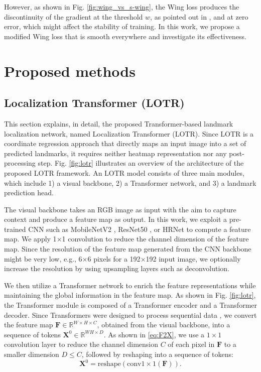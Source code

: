 \documentclass[journal]{IEEEtran}
\begin{document}
However, as shown in Fig. \ref{fig:wing_vs_s-wing}, the Wing loss produces the discontinuity of the gradient at the threshold $w$, as pointed out in \cite{Wang2019c}, and at zero error, which might affect the stability of training. 
In this work, we propose a modified Wing loss that is smooth everywhere and investigate its effectiveness.



\section{Proposed methods}\label{sec:proposed}

\subsection{Localization Transformer (LOTR)}\label{subsec:lotr}

This section explains, in detail, the proposed Transformer-based landmark localization network, named Localization Transformer (LOTR). 
Since LOTR is a coordinate regression approach that directly maps an input image into a set of predicted landmarks, it requires neither heatmap representation nor any post-processing step.  
Fig. \ref{fig:lotr} illustrates an overview of the architecture of the proposed LOTR framework.
An LOTR model consists of three main modules, which include 1) a visual backbone, 2) a Transformer network, and 3) a landmark prediction head.

The visual backbone takes an RGB image as input with the aim to capture context and produce a feature map as output.
In this work, we exploit a pre-trained CNN such as MobileNetV2 \cite{sandler2018}, ResNet50 \cite{resnet2016}, or HRNet \cite{Wang2021HRNet} to compute a feature map. 
We apply 1$\times$1 convolution to reduce the channel dimension of the feature map.
Since the resolution of the feature map generated from the CNN backbone might be very low, e.g., 6$\times$6 pixels for a 192$\times$192 input image, we optionally increase the resolution by using upsampling layers such as deconvolution.

We then utilize a Transformer network \cite{Vaswani} to enrich the feature representations while maintaining the global information in the feature map. 
As shown in Fig. \ref{fig:lotr}, the Transformer module is composed of a Transformer encoder and a Transformer decoder. 
Since Transformers were designed to process sequential data \cite{Vaswani}, we convert the feature map $\mathbf{F} \in \mathbb{R}^{W \times H \times C}$, obtained from the visual backbone, into a sequence of tokens $\mathbf{X}^0 \in \mathbb{R}^{WH \times D}$.
As shown in \eqref{eq:F2X}, we use a $1 \times 1$ convolution layer to reduce the channel dimension $C$ of each pixel in $\mathbf{F}$ to a smaller dimension $D \leq C$, followed by reshaping into a sequence of tokens:
\begin{equation}
\label{eq:F2X}
    \mathbf{X}^0 = \text{reshape}(\text{conv1}{\times}\text{1}(\mathbf{F})).
\end{equation}
\end{document}
